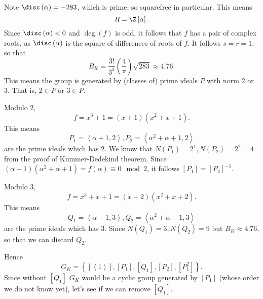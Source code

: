 \documentclass[pmath441]{subfiles}
\begin{document}
    \begin{answer}
        Note $\disc\left( \alpha \right) = -283$, which is prime, so squarefree in particular. This means
        \begin{equation*}
            R = \Z\left[ \alpha \right].
        \end{equation*}
        Since $\disc\left( \alpha \right)<0$ and $\deg\left( f \right)$ is odd, it follows that $f$ has a pair of complex roots, as $\disc\left( \alpha \right)$ is the square of differences of roots of $f$. It follows $s=r=1$, so that
        \begin{equation*}
            B_K = \frac{3!}{3^3}\left( \frac{4}{\pi} \right)\sqrt{283} \approx 4.76.
        \end{equation*}
        This means the group is generated by (classes of) prime ideals $P$ with norm $2$ or $3$. That is, $2\in P$ or $3\in P$.

        Modulo $2$,
        \begin{equation*}
            f = x^{3}+1 = \left( x+1 \right)\left( x^{2}+x+1 \right).
        \end{equation*}
        This means
        \begin{equation*}
            P_1 = \left< \alpha+1,2 \right>, P_2 = \left< \alpha^{2}+\alpha+1,2 \right>  
        \end{equation*}
        are the prime ideals which has $2$. We know that $N\left( P_1 \right) = 2^1, N\left( P_2 \right) = 2^{2} = 4$ from the proof of Kummer-Dedekind theorem. Since $\left( \alpha+1 \right)\left( \alpha^{2}+\alpha+1 \right) = f\left( \alpha \right) \equiv 0 \mod 2$, it follows $\left[ P_1 \right] = \left[ P_2 \right]^{-1}$.

        Modulo $3$,
        \begin{equation*}
            f = x^{3}+x+1 = \left( x+2 \right)\left( x^{2}+x+2 \right).
        \end{equation*}
        This means
        \begin{equation*}
            Q_1 = \left< \alpha-1,3 \right>, Q_2 = \left< \alpha^{2}+\alpha-1,3 \right>  
        \end{equation*}
        are the prime ideals which has $3$. Since $N\left( Q_1 \right) = 3, N\left( Q_2 \right) = 9$ but $B_K\approx 4.76$, so that we can discard $Q_2$.

        Hence
        \begin{equation*}
            G_K = \left\lbrace \left[ \left< 1 \right>  \right], \left[ P_1 \right], \left[ Q_1 \right],\left[ P_2 \right],\left[ P_1^{2} \right] \right\rbrace.
        \end{equation*}
        Since without $\left[ Q_1 \right]$ $G_K$ would be a cyclic group generated by $\left[ P_1 \right]$ (whose order we do not know yet), let's see if we can remove $\left[ Q_1 \right]$.


\end{answer}
\end{document}
